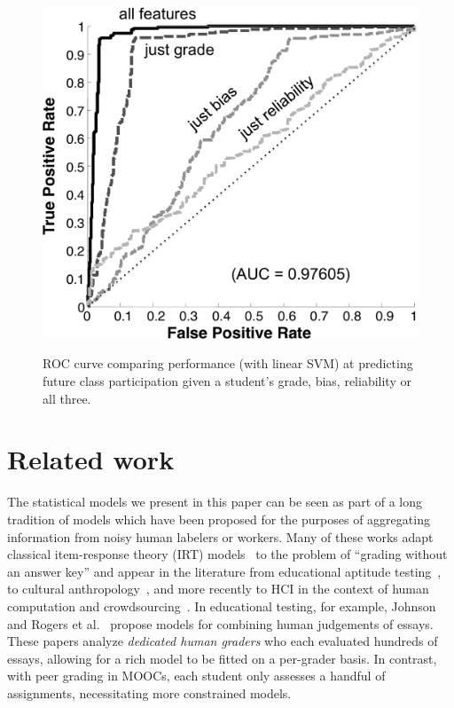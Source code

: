 \begin{figure}[h]
\begin{center}

\includegraphics[width=.44\textwidth]{img/roc.pdf}
\label{fig:roc}
\end{center}
\caption[Predicting future class participation using peer grading]{ROC curve comparing performance (with linear SVM) at predicting future class participation given
a student's grade, bias, reliability or all three.
}
\end{figure}

\section{Related work}\label{sec:relatedwork}
The statistical models we present in this paper can be seen as part of a long tradition of models which have been proposed for the purposes of aggregating information from noisy human labelers or workers.
Many of these works adapt classical item-response theory (IRT) models~\cite{baker01} to the problem of
``grading without an answer key'' and appear in the literature from educational aptitude testing~\cite{johnson96,rogers10,mislevy99}, to
cultural anthropology~\cite{batchelder88,karabatsos03}, and more recently to HCI in the context of human computation and crowdsourcing~\cite{whitehill09}.
In educational testing, for example, Johnson~\cite{johnson96} and Rogers et al.~\cite{rogers10}
propose models for combining human judgements of essays.  %
These papers analyze \emph{dedicated human graders} who each evaluated hundreds
of essays, allowing for a rich model to be fitted on a per-grader basis.  In contrast, with peer
grading in MOOCs, each student only assesses a handful of assignments, necessitating more constrained models.





